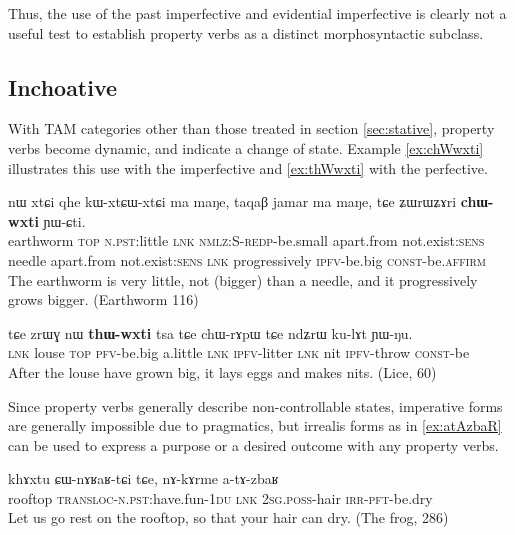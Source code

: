 \documentclass[oldfontcommands,oneside,a4paper,11pt]{article}
\newcommand{\ipa}[1]{{\phon \mbox{#1}}} %
\begin{document}
Thus,   the use of the past imperfective and    evidential imperfective is clearly not a useful test to establish property verbs  as a distinct morphosyntactic subclass.

\subsection{Inchoative} \label{sec:inchoative}
With TAM categories other than those treated in section \ref{sec:stative},  property verbs become dynamic, and indicate a change of state. Example \ref{ex:chWwxti} illustrates this use with the imperfective and \ref{ex:thWwxti} with the perfective.

\begin{exe}
\ex \label{ex:chWwxti}
\gll \ipa{qandʐe} 	\ipa{nɯ} 	\ipa{xtɕi} 	\ipa{qhe} 	\ipa{kɯ-xtɕɯ-xtɕi} 	\ipa{ma} 	\ipa{maŋe,} 	\ipa{taqaβ} 	\ipa{jamar} 	\ipa{ma} 	\ipa{maŋe,} 	\ipa{tɕe} 	\ipa{ʑɯrɯʑɤri} 	\ipa{\textbf{chɯ-wxti}} 	\ipa{ɲɯ-ɕti.}  \\
 earthworm \textsc{top} \textsc{n.pst}:little \textsc{lnk} \textsc{nmlz:S-redp}-be.small apart.from not.exist:\textsc{sens} needle apart.from not.exist:\textsc{sens} \textsc{lnk} progressively \textsc{ipfv}-be.big \textsc{const}-be.\textsc{affirm} \\
\glt The earthworm is very little, not (bigger) than a needle, and it progressively grows bigger. (Earthworm 116)
\end{exe}

\begin{exe}
\ex \label{ex:thWwxti}
\gll
\ipa{tɕe} 	\ipa{zrɯɣ} 	\ipa{nɯ} 	\ipa{\textbf{thɯ-wxti}} 	\ipa{tsa} 	\ipa{tɕe} 	\ipa{chɯ-rɤpɯ} 	\ipa{tɕe} 	\ipa{ndʑrɯ} 	\ipa{ku-lɤt} 	\ipa{ɲɯ-ŋu.} \\
\textsc{lnk} louse \textsc{top} \textsc{pfv}-be.big a.little \textsc{lnk} \textsc{ipfv}-litter \textsc{lnk} nit \textsc{ipfv}-throw \textsc{const}-be \\
\glt After the louse have grown big, it lays eggs and makes nits. (Lice, 60)
\end{exe}

Since property verbs generally describe non-controllable states, imperative forms are generally impossible due to pragmatics, but irrealis forms  as in \ref{ex:atAzbaR} can be used to express a purpose or a desired outcome with any property verbs.

\begin{exe}
\ex \label{ex:atAzbaR}
\gll
\ipa{khɤxtu} 	\ipa{ɕɯ-nɤʁaʁ-tɕi} 	\ipa{tɕe,} 	\ipa{nɤ-kɤrme} 	\ipa{a-tɤ-zbaʁ} \\
rooftop \textsc{transloc-n.pst}:have.fun-\textsc{1du} \textsc{lnk} \textsc{2sg.poss}-hair \textsc{irr-pft-}be.dry \\
\glt Let us go rest on the rooftop, so that your hair can dry. (The frog, 286)
\end{exe}
\end{document}
